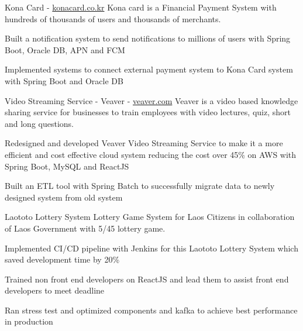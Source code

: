 \documentclass[10pt]{article}
\begin{document}
\spacedhrule{0.8ex}{0.0ex}
\headedsectionthree
{Kona Card - {\href{https://konacard.co.kr/}{konacard.co.kr}}}{}
{Kona card is a Financial Payment System with hundreds of thousands of users and thousands of merchants.}{\vspace{-2.4ex}
\begin{circlist}	
	\item Built a notification system to send notifications to millions of users with Spring Boot, Oracle DB, APN and FCM
	\item Implemented systems to connect external payment system to Kona Card system with Spring Boot and Oracle DB
\end{circlist}
\begin{indentsection}
\end{indentsection}
}
\headedsectionthree
{Video Streaming Service - Veaver - {\href{https://veaver.com/}{veaver.com}}}{}
{Veaver is a video based knowledge sharing service for businesses to train employees with video lectures, quiz, short and long questions.}
{\vspace{-2.4ex}
\begin{circlist}	
	\item Redesigned and developed Veaver Video Streaming Service to make it a more efficient and cost effective cloud system reducing the cost over 45\% on AWS with Spring Boot, MySQL and ReactJS
	\item Built an ETL tool with Spring Batch to successfully migrate data to newly designed system from old system
\end{circlist}
\begin{indentsection}
\end{indentsection}
}
\headedsectionthree
{Laototo Lottery System}{}
{Lottery Game System for Laos Citizens in collaboration of Laos Government with 5/45 lottery game.}
{\vspace{-2.4ex}
\begin{circlist}
	\item Implemented CI/CD pipeline with Jenkins for this Laototo Lottery System which saved development time by 20\%
	\item Trained non front end developers on ReactJS and lead them to assist front end developers to meet deadline
	\item Ran stress test and optimized components and kafka to achieve best performance in production
\end{circlist}
\begin{indentsection}
\end{indentsection}
}
\end{document}
